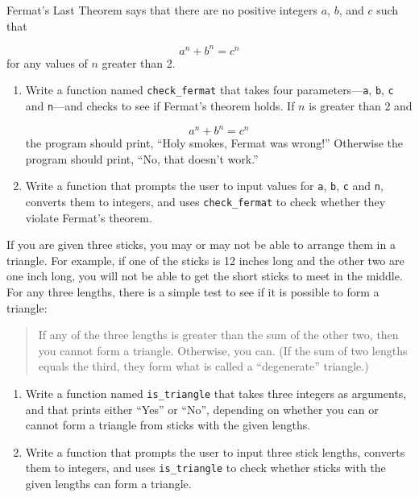 \documentclass[10pt]{book}
\begin{document}
\begin{exercise}

Fermat's Last Theorem says that there are no positive integers
$a$, $b$, and $c$ such that

\[ a^n + b^n = c^n \]
%
for any values of $n$ greater than 2.

\begin{enumerate}

\item Write a function named \verb"check_fermat" that takes four
parameters---{\tt a}, {\tt b}, {\tt c} and {\tt n}---and
checks to see if Fermat's theorem holds.  If
$n$ is greater than 2 and

\[a^n + b^n = c^n \]
%
the program should print, ``Holy smokes, Fermat was wrong!''
Otherwise the program should print, ``No, that doesn't work.''

\item Write a function that prompts the user to input values
for {\tt a}, {\tt b}, {\tt c} and {\tt n}, converts them to
integers, and uses \verb"check_fermat" to check whether they
violate Fermat's theorem.

\end{enumerate}

\end{exercise}


\begin{exercise}

If you are given three sticks, you may or may not be able to arrange
them in a triangle.  For example, if one of the sticks is 12 inches
long and the other two are one inch long, you will
not be able to get the short sticks to meet in the middle.  For any
three lengths, there is a simple test to see if it is possible to form
a triangle:

\begin{quotation}
If any of the three lengths is greater than the sum of the other
  two, then you cannot form a triangle.  Otherwise, you
  can.  (If the sum of two lengths equals the third, they form
    what is called a ``degenerate'' triangle.)
\end{quotation}

\begin{enumerate}

\item Write a function named \verb"is_triangle" that takes three
  integers as arguments, and that prints either ``Yes'' or ``No'', depending
  on whether you can or cannot form a triangle from sticks with the
  given lengths.

\item Write a function that prompts the user to input three stick
  lengths, converts them to integers, and uses \verb"is_triangle" to
  check whether sticks with the given lengths can form a triangle.

\end{enumerate}

\end{exercise}
\end{document}
